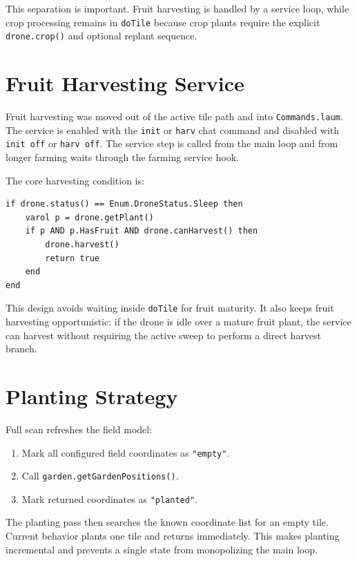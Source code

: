 \documentclass[11pt]{article}
\begin{document}
This separation is important. Fruit harvesting is handled by a service loop,
while crop processing remains in \texttt{doTile} because crop plants require
the explicit \texttt{drone.crop()} and optional replant sequence.

\section{Fruit Harvesting Service}

Fruit harvesting was moved out of the active tile path and into
\texttt{Commands.laum}. The service is enabled with the \texttt{init} or
\texttt{harv} chat command and disabled with \texttt{init off} or
\texttt{harv off}. The service step is called from the main loop and from
longer farming waits through the farming service hook.

The core harvesting condition is:

\begin{verbatim}
if drone.status() == Enum.DroneStatus.Sleep then
    varol p = drone.getPlant()
    if p AND p.HasFruit AND drone.canHarvest() then
        drone.harvest()
        return true
    end
end
\end{verbatim}

This design avoids waiting inside \texttt{doTile} for fruit maturity. It also
keeps fruit harvesting opportunistic: if the drone is idle over a mature fruit
plant, the service can harvest without requiring the active sweep to perform a
direct harvest branch.

\section{Planting Strategy}

Full scan refreshes the field model:

\begin{enumerate}
    \item Mark all configured field coordinates as \texttt{"empty"}.
    \item Call \texttt{garden.getGardenPositions()}.
    \item Mark returned coordinates as \texttt{"planted"}.
\end{enumerate}

The planting pass then searches the known coordinate list for an empty tile.
Current behavior plants one tile and returns immediately. This makes planting
incremental and prevents a single state from monopolizing the main loop.
\end{document}
